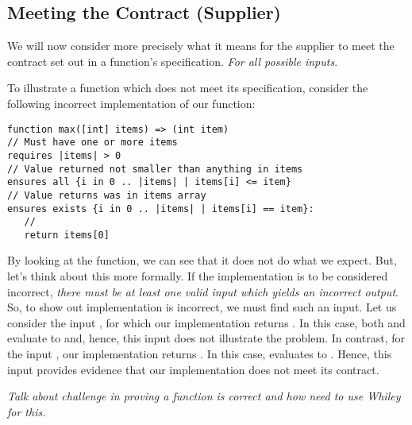 \subsection{Meeting the Contract (Supplier)}

We will now consider more precisely what it means for the supplier to meet the contract set out in a function's specification.  {\em For all possible inputs}.

\begin{eg}
To illustrate a function which does not meet its specification, consider the following incorrect implementation of our  function:
\begin{lstlisting}
function max([int] items) => (int item) 
// Must have one or more items
requires |items| > 0
// Value returned not smaller than anything in items
ensures all {i in 0 .. |items| | items[i] <= item}
// Value returns was in items array
ensures exists {i in 0 .. |items| | items[i] == item}:
   //
   return items[0]
\end{lstlisting}
By looking at the function, we can see that it does not do what we expect.  But, let's think about this more formally.  If the implementation is to be considered incorrect, {\em there must be at least one valid input which yields an incorrect output}.  So, to show out implementation is incorrect, we must find such an input.  Let us consider the input \lstinlinec{[5]}, for which our implementation returns .  In this case, both  and  evaluate to  and, hence, this input does not illustrate the problem.  In contrast, for the input \lstinlinec{[1,4]}, our implementation returns .  In this case,  evaluates to .  Hence, this input provides evidence that our implementation does not meet its contract.
\end{eg}

{\em Talk about challenge in proving a function is correct and how need to use Whiley for this.}

